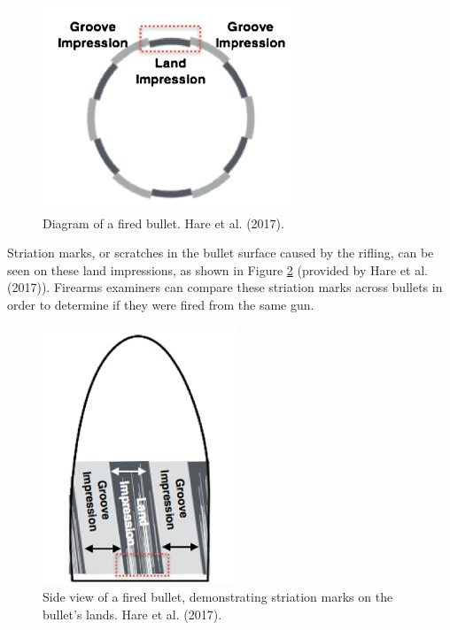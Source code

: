 \documentclass[print]{nuthesis}
\begin{document}
\begin{figure}

{\centering \includegraphics[width=0.5\linewidth]{images/bulletdiagram} 

}

\caption{Diagram of a fired bullet. Hare et al. (2017).}\label{fig:fireddiagram}
\end{figure}

Striation marks, or scratches in the bullet surface caused by the rifling, can be seen on these land impressions, as shown in Figure \ref{fig:firedland} (provided by Hare et al. (2017)).
Firearms examiners can compare these striation marks across bullets in order to determine if they were fired from the same gun.

\begin{figure}

{\centering \includegraphics[width=0.5\linewidth]{images/bulletland} 

}

\caption{Side view of a fired bullet, demonstrating striation marks on the bullet's lands. Hare et al. (2017).}\label{fig:firedland}
\end{figure}
\end{document}
